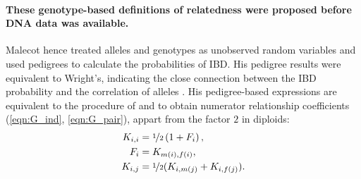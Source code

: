 \paragraph{These genotype-based definitions of relatedness were proposed
before DNA data was available.}
%
Malecot hence treated alleles and genotypes as unobserved random variables
and used pedigrees to calculate the probabilities of IBD.
%
His pedigree results were equivalent to Wright's, indicating the close
connection between the IBD probability and the correlation of alleles
\citep{malecot1948mathematiques, malecot1969mathemathics,
wright1965interpretation, thompson1976population, meulepas1991probabilistic,
slatkin2002modern, rousset2002inbreeding}.
%
His pedigree-based expressions are equivalent to the procedure of
\cite{emik1949systematic} and \cite{cruden1949computation} to obtain
numerator relationship coefficients (\ref{eqn:G_ind}, \ref{eqn:G_pair}),
appart from the factor $2$ in diploids:
%
\begin{align} \label{eqn:kinship_rules}
  K_{i,i} & =\nicefrac{1}{2}\left(1 + F_i\right), \\
  F_i & = K_{m(i),f(i)}, \notag \\
  K_{i,j} & = \nicefrac{1}{2}(K_{i,m(j)} + K_{i,f(j)}). \notag
\end{align} 
%


